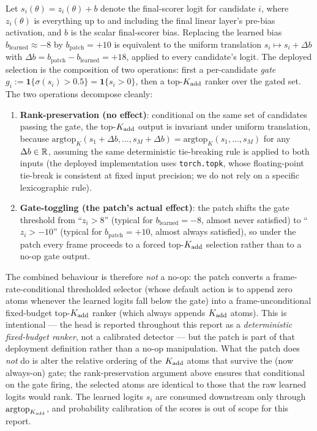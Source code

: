 Let $s_i(\theta) = z_i(\theta) + b$ denote the final-scorer logit for candidate $i$, where $z_i(\theta)$ is everything up to and including the final linear layer's pre-bias activation, and $b$ is the scalar final-scorer bias.
Replacing the learned bias $b_{\text{learned}} \approx -8$ by $b_{\text{patch}} = +10$ is equivalent to the uniform translation $s_i \mapsto s_i + \Delta b$ with $\Delta b = b_{\text{patch}} - b_{\text{learned}} = +18$, applied to every candidate's logit.
The deployed selection is the composition of two operations: first a per-candidate \emph{gate} $g_i := \mathbf{1}\{\sigma(s_i) > 0.5\} = \mathbf{1}\{s_i > 0\}$, then a top-$K_{\mathrm{add}}$ ranker over the gated set.
The two operations decompose cleanly:
\begin{enumerate}[leftmargin=*,itemsep=0pt,topsep=2pt]
  \item \textbf{Rank-preservation (no effect)}: conditional on the same set of candidates passing the gate, the top-$K_{\mathrm{add}}$ output is invariant under uniform translation, because $\mathrm{argtop}_K(s_1+\Delta b, \dots, s_M+\Delta b) = \mathrm{argtop}_K(s_1, \dots, s_M)$ for any $\Delta b \in \mathbb{R}$, assuming the same deterministic tie-breaking rule is applied to both inputs (the deployed implementation uses \texttt{torch.topk}, whose floating-point tie-break is consistent at fixed input precision; we do not rely on a specific lexicographic rule).
  \item \textbf{Gate-toggling (the patch's actual effect)}: the patch shifts the gate threshold from ``$z_i > 8$'' (typical for $b_{\text{learned}} = -8$, almost never satisfied) to ``$z_i > -10$'' (typical for $b_{\text{patch}} = +10$, almost always satisfied), so under the patch every frame proceeds to a forced top-$K_{\mathrm{add}}$ selection rather than to a no-op gate output.
\end{enumerate}
The combined behaviour is therefore \emph{not} a no-op: the patch converts a frame-rate-conditional thresholded selector (whose default action is to append zero atoms whenever the learned logits fall below the gate) into a frame-unconditional fixed-budget top-$K_{\mathrm{add}}$ ranker (which always appends $K_{\mathrm{add}}$ atoms).
This is intentional --- the head is reported throughout this report as a \emph{deterministic fixed-budget ranker}, not a calibrated detector --- but the patch is part of that deployment definition rather than a no-op manipulation.
What the patch does \emph{not} do is alter the relative ordering of the $K_{\mathrm{add}}$ atoms that survive the (now always-on) gate; the rank-preservation argument above ensures that conditional on the gate firing, the selected atoms are identical to those that the raw learned logits would rank.
The learned logits $s_i$ are consumed downstream only through $\mathrm{argtop}_{K_{\mathrm{add}}}$, and probability calibration of the scores is out of scope for this report.

